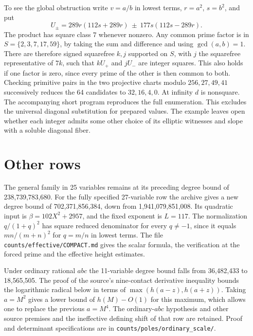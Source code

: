\documentclass[11pt]{article}
\begin{document}
To see the global obstruction write $v=a/b$ in lowest terms, $r=a^2$, $s=b^2$, and put
\[
 U_\pm=289r(112s+289r)\ \pm\ 177s(112s-289r).
\]
The product has square class $7$ whenever nonzero. Any common prime factor is in $S=\{2,3,7,17,59\}$, by taking the sum and difference and using $\gcd(a,b)=1$. There are therefore signed squarefree $k,j$ supported on $S$, with $j$ the squarefree representative of $7k$, such that $kU_+$ and $jU_-$ are integer squares. This also holds if one factor is zero, since every prime of the other is then common to both. Checking primitive pairs in the two projective charts modulo $256,27,49,41$ successively reduces the 64 candidates to $32,16,4,0$. At infinity $d$ is nonsquare. The accompanying short program reproduces the full enumeration. This excludes the universal diagonal substitution for prepared values. The example leaves open whether each integer admits some other choice of its elliptic witnesses and slope with a soluble diagonal fiber.

\section*{Other rows}
The general family in 25 variables remains at its preceding degree bound of 238,739,783,680. For the fully specified 27-variable row the archive gives a new degree bound of 702,371,856,384, down from 1,941,079,851,008. Its quadratic input is $\beta=102X^2+2957$, and the fixed exponent is $L=117$. The normalization $q/(1+q)^2$ has square reduced denominator for every $q\ne-1$, since it equals $mn/(m+n)^2$ for $q=m/n$ in lowest terms. The file \texttt{counts/effective/COMPACT.md} gives the scalar formula, the verification at the forced prime and the effective height estimates.

Under ordinary rational $abc$ the 11-variable degree bound falls from 36,482,433 to 18,565,505. The proof of the source's nine-contact derivative inequality bounds the logarithmic radical below in terms of $\max(h(a-z),h(a+z))$. Taking $a=M^2$ gives a lower bound of $h(M)-O(1)$ for this maximum, which allows one to replace the previous $a=M^4$. The ordinary-$abc$ hypothesis and other source premises and the ineffective defining shift of that row are retained. Proof and determinant specifications are in \texttt{counts/poles/ordinary\_scale/}.
\end{document}
